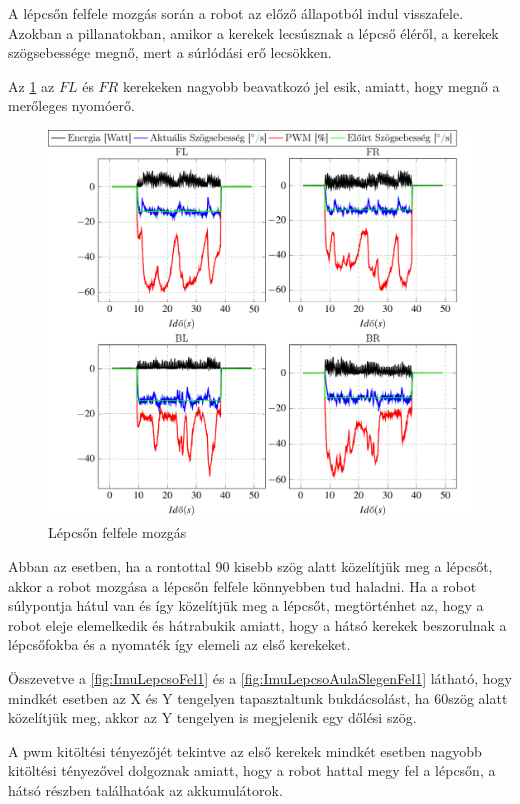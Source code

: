 A lépcsőn felfele mozgás során a robot az előző állapotból indul visszafele. Azokban a pillanatokban, amikor a kerekek lecsúsznak a lépcső éléről, a kerekek szögsebessége megnő, mert a súrlódási erő lecsökken.  

Az \ref{fig:LepcsoFelxx} az $FL$ és $FR$ kerekeken nagyobb beavatkozó jel esik, amiatt, hogy megnő a merőleges nyomóerő.

\begin{figure}[H]
  \includegraphics{tikz/LepcsoFelxx.pdf}
  \caption{Lépcsőn felfele mozgás}
  \label{fig:LepcsoFelxx}
\end{figure}

Abban az esetben, ha a rontottal 90 \degree kisebb szög alatt közelítjük meg a lépcsőt, akkor a robot mozgása a lépcsőn felfele könnyebben tud haladni. Ha a robot súlypontja hátul  van és így közelítjük meg a lépcsőt, megtörténhet az, hogy a robot eleje elemelkedik és hátrabukik amiatt, hogy a hátsó kerekek beszorulnak a lépcsőfokba és a nyomaték így elemeli az első kerekeket.

Összevetve a \ref{fig:ImuLepcsoFel1} és a \ref{fig:ImuLepcsoAulaSlegenFel1}
látható, hogy mindkét esetben az X és Y tengelyen tapasztaltunk bukdácsolást, ha 60\degree szög alatt közelítjük meg, akkor az Y tengelyen is megjelenik egy dőlési szög.

A pwm kitöltési tényezőjét tekintve az első kerekek mindkét esetben nagyobb kitöltési tényezővel dolgoznak amiatt, hogy a robot hattal megy fel a lépcsőn, a hátsó részben találhatóak az akkumulátorok.

